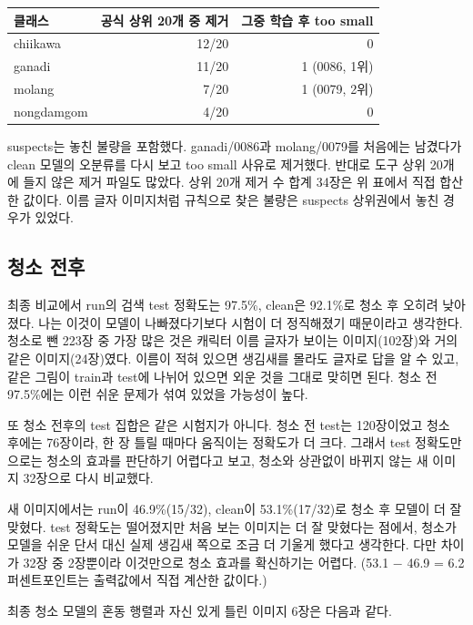 \documentclass[11pt]{article}
\begin{document}
\begin{center}\small
\begin{tabular}{lrr}
\toprule
클래스 & 공식 상위 20개 중 제거 & 그중 학습 후 too small \\
\midrule
chiikawa & 12/20 & 0 \\
ganadi & 11/20 & 1 (0086, 1위) \\
molang & 7/20 & 1 (0079, 2위) \\
nongdamgom & 4/20 & 0 \\
\bottomrule
\end{tabular}
\end{center}

suspects는 놓친 불량을 포함했다. ganadi/0086과 molang/0079를 처음에는
남겼다가 clean 모델의 오분류를 다시 보고 too small 사유로 제거했다.
반대로 도구 상위 20개에 들지 않은 제거 파일도 많았다. 상위 20개 제거 수
합계 34장은 위 표에서 직접 합산한 값이다. 이름 글자 이미지처럼 규칙으로
찾은 불량은 suspects 상위권에서 놓친 경우가 있었다.

\subsection*{청소 전후}

최종 비교에서 run의 검색 test 정확도는 97.5\%, clean은 92.1\%로 청소 후 오히려 낮아졌다.
나는 이것이 모델이 나빠졌다기보다 시험이 더 정직해졌기 때문이라고 생각한다.
청소로 뺀 223장 중 가장 많은 것은 캐릭터 이름 글자가 보이는 이미지(102장)와
거의 같은 이미지(24장)였다. 이름이 적혀 있으면 생김새를 몰라도 글자로 답을 알 수 있고,
같은 그림이 train과 test에 나뉘어 있으면 외운 것을 그대로 맞히면 된다.
청소 전 97.5\%에는 이런 쉬운 문제가 섞여 있었을 가능성이 높다.

또 청소 전후의 test 집합은 같은 시험지가 아니다. 청소 전 test는 120장이었고
청소 후에는 76장이라, 한 장 틀릴 때마다 움직이는 정확도가 더 크다.
그래서 test 정확도만으로는 청소의 효과를 판단하기 어렵다고 보고,
청소와 상관없이 바뀌지 않는 새 이미지 32장으로 다시 비교했다.

새 이미지에서는 run이 46.9\%(15/32), clean이 53.1\%(17/32)로 청소 후 모델이 더 잘 맞혔다.
test 정확도는 떨어졌지만 처음 보는 이미지는 더 잘 맞혔다는 점에서,
청소가 모델을 쉬운 단서 대신 실제 생김새 쪽으로 조금 더 기울게 했다고 생각한다.
다만 차이가 32장 중 2장뿐이라 이것만으로 청소 효과를 확신하기는 어렵다.
(53.1 $-$ 46.9 = 6.2퍼센트포인트는 출력값에서 직접 계산한 값이다.)

최종 청소 모델의 혼동 행렬과 자신 있게 틀린 이미지 6장은 다음과 같다.
\begin{center}\hfill
{}\end{center}
\end{document}
